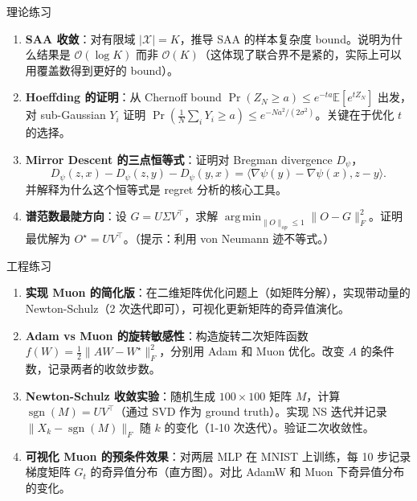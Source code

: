 \documentclass[aspectratio=169,10pt]{ctexbeamer}
\newcommand{\E}{\mathbb{E}}
\newcommand{\grad}{\nabla}
\DeclareMathOperator*{\argmin}{arg\,min}
\DeclareMathOperator{\sgn}{sgn}
\begin{document}
\begin{frame}{理论练习}
\begin{enumerate}
  \item \textbf{SAA 收敛}：对有限域 $|\mathcal{X}|=K$，推导 SAA 的样本复杂度 bound。说明为什么结果是 $\mathcal{O}(\log K)$ 而非 $\mathcal{O}(K)$（这体现了联合界不是紧的，实际上可以用覆盖数得到更好的 bound）。

  \item \textbf{Hoeffding 的证明}：从 Chernoff bound $\Pr(Z_N\ge a)\le e^{-ta}\E[e^{t Z_N}]$ 出发，对 sub-Gaussian $Y_i$ 证明 $\Pr(\frac1N\sum_i Y_i\ge a)\le e^{-Na^2/(2\sigma^2)}$。关键在于优化 $t$ 的选择。

  \item \textbf{Mirror Descent 的三点恒等式}：证明对 Bregman divergence $D_\psi$，
  \[
    D_\psi(z,x) - D_\psi(z,y) - D_\psi(y,x) = \langle\grad\psi(y)-\grad\psi(x),z-y\rangle.
  \]
  并解释为什么这个恒等式是 regret 分析的核心工具。

  \item \textbf{谱范数最陡方向}：设 $G=U\Sigma V^\top$，求解 $\argmin_{\|O\|_{op}\le 1}\|O-G\|_F^2$。证明最优解为 $O^\star=UV^\top$。（提示：利用 von Neumann 迹不等式。）
\end{enumerate}
\end{frame}

\begin{frame}{工程练习}
\begin{enumerate}
  \item \textbf{实现 Muon 的简化版}：在二维矩阵优化问题上（如矩阵分解），实现带动量的 Newton-Schulz（2 次迭代即可），可视化更新矩阵的奇异值演化。

  \item \textbf{Adam vs Muon 的旋转敏感性}：构造旋转二次矩阵函数 $f(W)=\frac12\|AW-W^\star\|_F^2$，分别用 Adam 和 Muon 优化。改变 $A$ 的条件数，记录两者的收敛步数。

  \item \textbf{Newton-Schulz 收敛实验}：随机生成 $100\times100$ 矩阵 $M$，计算 $\sgn(M)=UV^\top$（通过 SVD 作为 ground truth）。实现 NS 迭代并记录 $\|X_k-\sgn(M)\|_F$ 随 $k$ 的变化（1-10 次迭代）。验证二次收敛性。

  \item \textbf{可视化 Muon 的预条件效果}：对两层 MLP 在 MNIST 上训练，每 10 步记录梯度矩阵 $G_t$ 的奇异值分布（直方图）。对比 AdamW 和 Muon 下奇异值分布的变化。
\end{enumerate}
\end{frame}
\end{document}
